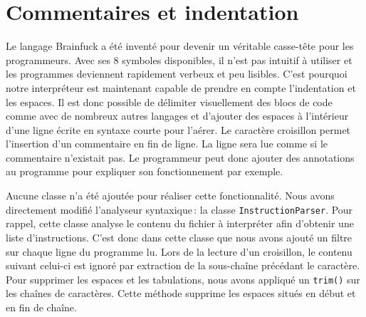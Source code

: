 \documentclass{article}
\begin{document}
\section{Commentaires et indentation}
    Le langage Brainfuck a été inventé pour devenir un véritable casse-tête pour les programmeurs. Avec ses 8 symboles disponibles, il n’est pas intuitif à utiliser et les programmes deviennent rapidement verbeux et peu lisibles. C’est pourquoi notre interpréteur est maintenant capable de prendre en compte l’indentation et les espaces. Il est donc possible de délimiter visuellement des blocs de code comme avec de nombreux autres langages et d’ajouter des espaces à l’intérieur d’une ligne écrite en syntaxe courte pour l’aérer. Le caractère croisillon permet l'insertion d'un commentaire en fin de ligne. La ligne sera lue comme si le commentaire n’existait pas. Le programmeur peut donc ajouter des annotations au programme pour expliquer son fonctionnement par exemple.

    Aucune classe n’a été ajoutée pour réaliser cette fonctionnalité. Nous avons directement modifié l'analyseur syntaxique : la classe \texttt{InstructionParser}. Pour rappel, cette classe analyse le contenu du fichier à interpréter afin d’obtenir une liste d’instructions. C’est donc dans cette classe que nous avons ajouté un filtre sur chaque ligne du programme lu. Lors de la lecture d’un croisillon, le contenu suivant celui-ci est ignoré par extraction de la sous-chaîne précédant le caractère. Pour supprimer les espaces et les tabulations, nous avons appliqué un \texttt{trim()} sur les chaînes de caractères. Cette méthode supprime les espaces situés en début et en fin de chaîne.
\end{document}
